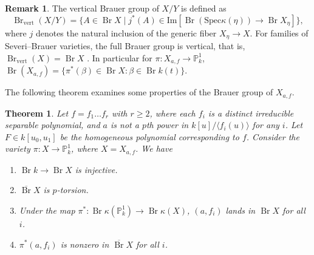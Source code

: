 \documentclass[11pt]{amsart}
\theoremstyle{plain}
\newtheorem{theorem}[thm]{Theorem}
\theoremstyle{definition}
\newtheorem{remark}[thm]{Remark}
\DeclareMathOperator{\Br}{Br}
\begin{document}
\begin{remark}
    The vertical Brauer group of \( X/Y \) is defined as
\[
\Br_{\text{vert}}(X/Y) = \{ A \in \Br X \mid j^*(A) \in \text{Im}[\Br(\text{Spec}\kappa(\eta)) \to \Br X_\eta] \},
\]
where $j$ denotes the natural inclusion of the generic fiber $X_{\eta} \to X.$ For families of Severi--Brauer varieties, the full Brauer group is vertical, that is, $\Br_{\text{vert}}(X)= \Br X$ \cite[Remark 11.1.12]{BG}. In particular for \( \pi: X_{a,f} \to \mathbb{P}^1_k \), $\Br (X_{a,f}) = \{ \pi^{*}(\beta) \in \Br X: \beta \in \Br k(t) \}$.
    \end{remark}

    
The following theorem examines some properties of the Brauer group of $X_{a,f}$.
	
	\begin{theorem}\label{p-torsion  brauer group}
		Let \( f = f_1 \dots f_r \) with \( r \geq 2 \), where each \( f_i \) is a distinct irreducible separable polynomial, and \( a \) is not a \( p \)th power in \( k[u]/\langle f_i(u) \rangle \) for any \( i \). Let \( F \in k[u_0, u_1] \) be the homogeneous polynomial corresponding to $f$. Consider the variety \( \pi: X \to \mathbb{P}^1_k \), where \( X = X_{a,f} \). We have
		\begin{enumerate}[label=\arabic*.]
			\item \label{injective} 
			$\Br k\rightarrow \Br X$ is injective. 
			\item \label{p-torsion Br}
			$\overline{\Br}X$ is $p$-torsion.
			\item \label{unramified brauer}
			Under the map \( \pi^*: \Br \kappa(\mathbb{P}^1_k) \rightarrow \Br \kappa(X) \), \( (a, f_i) \) lands in \( \Br X \) for all $i$.
			
			\item\label{nonzero Br}
			\( \pi^*(a,f_i) \) is nonzero in \( \overline{\Br}X \) for all $i$.
			
		\end{enumerate}
	\end{theorem}
    
\end{document}
